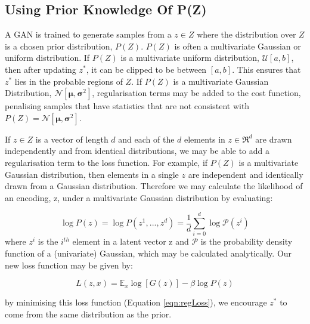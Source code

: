 \documentclass[journal]{IEEEtran}
\begin{document}
\subsection{Using Prior Knowledge Of P(Z)}

A GAN is trained to generate samples from a $z \in Z$ where the distribution over $Z$ is a chosen prior distribution, $P(Z)$. $P(Z)$ is often a multivariate Gaussian or uniform distribution. If $P(Z)$ is a multivariate uniform distribution, $\mathcal{U}[a,b]$, then after updating $z^*$, it can be clipped to be between $[a,b]$. This ensures that $z^*$ lies in the probable regions of $Z$. If $P(Z)$ is a multivariate Gaussian Distribution, $\mathcal{N}[\mathbf{\mu},\mathbf{\sigma}^2]$, regularisation terms may be added to the cost function, penalising samples that have statistics that are not consistent with $P(Z)=\mathcal{N}[\mathbf{\mu},\mathbf{\sigma}^2]$.


If $z \in Z$ is a vector of length $d$ and each of the $d$ elements in $z \in \Re^d$ are drawn independently and from identical distributions, we may be able to add a regularisation term to the loss function. For example, if $P(Z)$ is a multivariate Gaussian distribution, then elements in a single $z$ are independent and identically drawn from a Gaussian distribution. Therefore we may calculate the likelihood of an encoding, z, under a multivariate Gaussian distribution by evaluating:

\[ \log P(z) = \log P(z^1, ..., z^d) = \frac{1}{d}\sum_{i=0}^d \log \mathcal{P}(z^i) \] 
where $z^i$ is the $i^{th}$ element in a latent vector z and $\mathcal{P}$ is the probability density function of a (univariate) Gaussian, which may be calculated analytically. Our new loss function may be given by:




\begin{equation} \label{eqn:regLoss}
     L(z,x) = {\mathbb E}_x \log[G(z)] - \beta \log P(z)
\end{equation}

by minimising this loss function (Equation \ref{eqn:regLoss}), we encourage $z^*$ to come from the same distribution as the prior.

\end{document}
